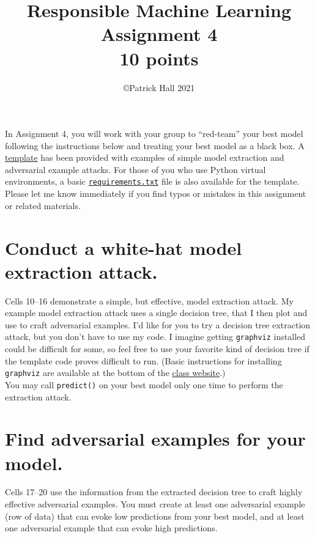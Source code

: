 \documentclass[fleqn]{article}
\title{Responsible Machine Learning\\\Large{Assignment 4}\\\Large{10 points}}
\author{\copyright Patrick Hall 2021}
\begin{document}
\maketitle

\noindent In Assignment 4, you will work with your group to ``red-team'' your best model following the instructions below and treating your best model as a black box. A \href{https://nbviewer.jupyter.org/github/jphall663/GWU_rml/blob/master/assignments/assignment_4/assign_4_template.ipynb?flush_cache=true}{template} has been provided with examples of simple model extraction and adversarial example attacks. For those of you who use Python virtual environments, a basic \href{https://github.com/jphall663/GWU_rml/blob/master/assignments/requirements.txt}{\texttt{requirements.txt}} file is also available for the template.\\

\noindent Please let me know immediately if you find typos or mistakes in this assignment or related materials. 

\section{Conduct a white-hat model extraction attack.}

Cells 10--16 demonstrate a simple, but effective, model extraction attack. My example model extraction attack uses a single decision tree, that I then plot and use to craft adversarial examples. I'd like for you to try a decision tree extraction attack, but you don't have to use my code. I imagine getting \texttt{graphviz} installed could be difficult for some, so feel free to use your favorite kind of decision tree if the template code proves difficult to run. (Basic instructions for installing \texttt{graphviz} are available at the bottom of the \href{https://jphall663.github.io/GWU_rml/}{class website}.)\\

\noindent You may call \texttt{predict()} on your best model only one time to perform the extraction attack.
 
\section{Find adversarial examples for your model.}

Cells 17--20 use the information from the extracted decision tree to craft highly effective adversarial examples. You must create at least one adversarial example (row of data) that can evoke low predictions from your best model, and at least one adversarial example that can evoke high predictions.\\
\end{document}
